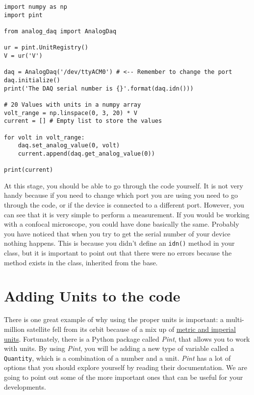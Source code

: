 \begin{verbatim}
import numpy as np
import pint

from analog_daq import AnalogDaq

ur = pint.UnitRegistry()
V = ur('V')

daq = AnalogDaq('/dev/ttyACM0') # <-- Remember to change the port
daq.initialize()
print('The DAQ serial number is {}'.format(daq.idn()))

# 20 Values with units in a numpy array
volt_range = np.linspace(0, 3, 20) * V 
current = [] # Empty list to store the values

for volt in volt_range:
    daq.set_analog_value(0, volt)
    current.append(daq.get_analog_value(0))

print(current)
\end{verbatim}

At this stage, you should be able to go through the code yourself. It is
not very handy because if you need to change which port you are using
you need to go through the code, or if the device is connected to a
different port. However, you can see that it is very simple to perform a
measurement. If you would be working with a confocal microscope, you
could have done basically the same. Probably you have noticed that when
you try to get the serial number of your device nothing happens. This is
because you didn't define an \texttt{idn()} method in your class, but it
is important to point out that there were no errors because the method
exists in the class, inherited from the base.



\section{Adding Units to the code}\label{adding-units-to-thecode}

There is one great example of why using the proper units is important: a
multi-million satellite fell from its orbit because of a mix up of
\href{http://articles.latimes.com/1999/oct/01/news/mn-17288}{metric and
imperial units}. Fortunately, there is a Python package called
\emph{Pint}, that allows you to work with units. By using \emph{Pint},
you will be adding a new type of variable called a \texttt{Quantity},
which is a combination of a number and a unit. \emph{Pint} has a lot of
options that you should explore yourself by reading their documentation.
We are going to point out some of the more important ones that can be
useful for your developments.

